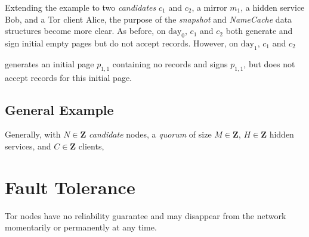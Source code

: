 Extending the example to two \emph{candidates} $ c_{1} $ and $ c_{2} $, a mirror $ m_{1} $, a hidden service Bob, and a Tor client Alice, the purpose of the \emph{snapshot} and \emph{NameCache} data structures become more clear. As before, on $ \textrm{day}_{0} $, $ c_{1} $ and $ c_{2} $ both generate and sign initial empty pages but do not accept records. However, on $ \textrm{day}_{1} $, $ c_{1} $ and $ c_{2} $ 

generates an initial page $ p_{1,1} $ containing no records and signs $ p_{1,1} $, but does not accept records for this initial page.

\subsection{General Example}

Generally, with $ N \in \textbf{Z} $ \emph{candidate} nodes, a \emph{quorum} of size $ M \in \textbf{Z} $, $ H \in \textbf{Z} $ hidden services, and $ C \in \textbf{Z} $ clients,

%
%
%		  
%
%		  
%			
%			
%			
%

\section{Fault Tolerance}

Tor nodes have no reliability guarantee and may disappear from the network momentarily or permanently at any time. 



